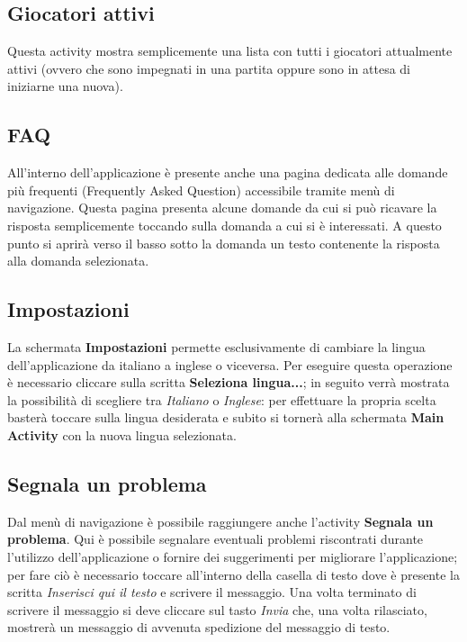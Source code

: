 \documentclass[a4paper,12pt,twoside,openright]{report}
\begin{document}
\subsection{Giocatori attivi}
Questa activity mostra semplicemente una lista con tutti i giocatori attualmente attivi (ovvero che sono impegnati in una partita oppure sono in attesa di iniziarne una nuova).

\subsection{FAQ}
All'interno dell'applicazione è presente anche una pagina dedicata alle domande più frequenti (Frequently Asked Question) accessibile tramite menù di navigazione.
Questa pagina presenta alcune domande da cui si può ricavare la risposta semplicemente toccando sulla domanda a cui si è interessati. A questo punto si aprirà verso il basso
sotto la domanda un testo contenente la risposta alla domanda selezionata.

\subsection{Impostazioni}
La schermata \textbf{Impostazioni} permette esclusivamente di cambiare la lingua dell'applicazione da italiano a inglese o viceversa. Per eseguire questa operazione è necessario 
cliccare sulla scritta \textbf{Seleziona lingua...}; in seguito verrà mostrata la possibilità di scegliere tra \textit{Italiano} o \textit{Inglese}: per effettuare la propria scelta basterà toccare
sulla lingua desiderata e subito si tornerà alla schermata \textbf{Main Activity} con la nuova lingua selezionata.

\subsection{Segnala un problema}
Dal menù di navigazione è possibile raggiungere anche l'activity \textbf{Segnala un problema}. Qui è possibile segnalare eventuali problemi riscontrati durante l'utilizzo dell'applicazione
o fornire dei suggerimenti per migliorare l'applicazione; per fare ciò è necessario toccare all'interno della casella di testo dove è presente la scritta \textit{Inserisci qui il testo} e scrivere
il messaggio. Una volta terminato di scrivere il messaggio si deve cliccare sul tasto \textit{Invia} che, una volta rilasciato, mostrerà un messaggio di avvenuta spedizione del messaggio di testo.
\end{document}
